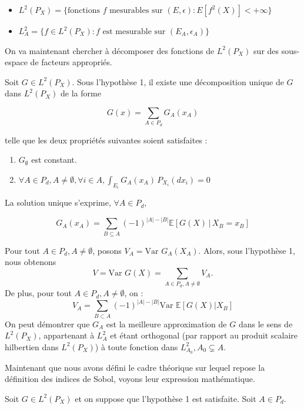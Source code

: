 \documentclass[
]{article}
\providecommand{\tightlist}{%
  \setlength{\itemsep}{0pt}\setlength{\parskip}{0pt}}
\begin{document}
\begin{itemize}
  \item \(L^2(P_X) = \{\text{fonctions }f \text{ mesurables sur } (E, \epsilon) : E[f^2(X)] < +\infty\}\)
  \item \(L^2_A = \{f \in L^2(P_X) : f \text{ est mesurable sur }(E_A, \epsilon_A)\}\) 
\end{itemize}

On va maintenant chercher à décomposer des fonctions de \(L^2(P_X)\) sur
des sous-espace de facteurs appropriés.

Soit \(G \in L^2(P_X)\). Sous l'hypothèse 1, il existe une décomposition
unique de \(G\) dans \(L^2(P_X)\) de la forme

\[
G(x) = \sum_{A \in P_d} G_A(x_A)
\]

telle que les deux propriétés suivantes soient satisfaites :

\begin{enumerate}
\def\labelenumi{\arabic{enumi}.}
\tightlist
\item
  \(G_\emptyset\) est constant.
\item
  \(\forall A \in P_d, A \neq \emptyset, \forall i \in A, \int_{E_i} G_A(x_A) \, P_{X_i}(dx_i) = 0\)
\end{enumerate}

La solution unique s'exprime, \(\forall A \in P_{d},\)

\[
G_A(x_A) = \sum_{B \subseteq A} (-1)^{|A| - |B|} \mathbb{E}[G(X) \,|\, X_B = x_B]
\]

Pour tout \(A \in P_d, A \neq \emptyset\), posons
\(V_A = \text{Var } G_A(X_A)\). Alors, sous l'hypothèse 1, nous obtenons
\[
V = \text{Var } G(X) = \sum_{A \in P_d, A \neq \emptyset} V_A.
\] De plus, pour tout \(A \in P_d, A \neq \emptyset\), on : \[
V_A = \sum_{B \subset A} (-1)^{|A| - |B|} \text{Var } \mathbb{E}[G(X)|X_B]
\] On peut démontrer que \(G_A\) est la meilleure approximation de \(G\)
dans le sens de \(L^2(P_X)\), appartenant à \(L^2_A\) et étant
orthogonal (par rapport au produit scalaire hilbertien dans
\(L^2(P_X)\)) à toute fonction dans \(L^2_{A_0}, A_0 \subsetneq A\).

Maintenant que nous avons défini le cadre théorique sur lequel repose la
définition des indices de Sobol, voyons leur expression mathématique.

Soit \(G \in L^2(P_X)\) et on suppose que l'hypothèse 1 est satisfaite.
Soit \(A \in P_d\).
\end{document}
